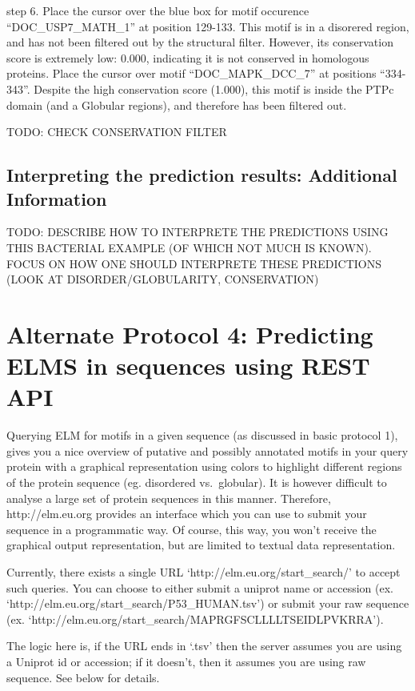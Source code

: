 step 6. Place the cursor over the blue box for motif occurence
``DOC\_USP7\_MATH\_1'' at position 129-133. This motif is in a disorered
region, and has not been filtered out by the structural filter. However,
its conservation score is extremely low: 0.000, indicating it is not
conserved in homologous proteins. Place the cursor over motif
``DOC\_MAPK\_DCC\_7'' at positions ``334-343''. Despite the high
conservation score (1.000), this motif is inside the PTPc domain (and a
Globular regions), and therefore has been filtered out.

TODO: CHECK CONSERVATION FILTER

\subsection{Interpreting the prediction results: Additional
Information}\label{interpreting-the-prediction-results-additional-information}

TODO: DESCRIBE HOW TO INTERPRETE THE PREDICTIONS USING THIS BACTERIAL
EXAMPLE (OF WHICH NOT MUCH IS KNOWN). FOCUS ON HOW ONE SHOULD INTERPRETE
THESE PREDICTIONS (LOOK AT DISORDER/GLOBULARITY, CONSERVATION)

\section{Alternate Protocol 4: Predicting ELMS in sequences using REST
API}\label{alternate-protocol-4-predicting-elms-in-sequences-using-rest-api}

Querying ELM for motifs in a given sequence (as discussed in basic
protocol 1), gives you a nice overview of putative and possibly
annotated motifs in your query protein with a graphical representation
using colors to highlight different regions of the protein sequence (eg.
disordered vs.~globular). It is however difficult to analyse a large set
of protein sequences in this manner. Therefore, http://elm.eu.org
provides an interface which you can use to submit your sequence in a
programmatic way. Of course, this way, you won't receive the graphical
output representation, but are limited to textual data representation.

Currently, there exists a single URL `http://elm.eu.org/start\_search/'
to accept such queries. You can choose to either submit a uniprot name
or accession (ex. `http://elm.eu.org/start\_search/P53\_HUMAN.tsv') or
submit your raw sequence (ex.
`http://elm.eu.org/start\_search/MAPRGFSCLLLLTSEIDLPVKRRA').

The logic here is, if the URL ends in `.tsv' then the server assumes you
are using a Uniprot id or accession; if it doesn't, then it assumes you
are using raw sequence. See below for details.

